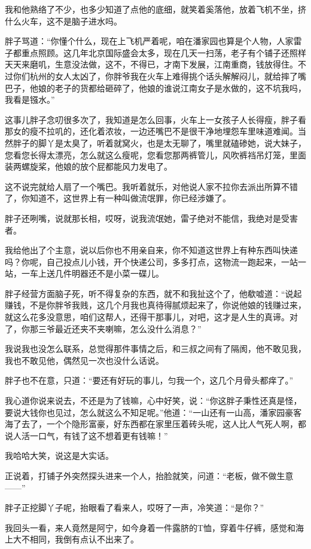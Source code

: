 我和他熟络了不少，也多少知道了点他的底细，就笑着奚落他，放着飞机不坐，挤什么火车，这不是脑子进水吗。

胖子骂道：“你懂个什么，现在上飞机严着呢，咱在潘家园也算是个人物，人家雷子都重点照顾。这几年北京国际盛会太多，现在几天一扫荡，老子有个铺子还照样天天来磨叽，生意没法做，这不，不得已，才南下发展，江南重商，钱放得住。不过你们杭州的女人太凶了，你胖爷我在火车上难得挑个话头解解闷儿，就给摔了嘴巴子，他娘的老子的货都给砸碎了，他娘的谁说江南女子是水做的，这不坑我吗，我看是镪水。”

这事儿胖子念叨很多次了，我知道是怎么回事，火车上一女孩子人长得瘦，胖子看那女的瘦不拉叽的，还化着浓妆，一边还嘴巴不是很干净地埋怨车里味道难闻。当然胖子的脚丫是太臭了，听着就窝火，也是太无聊了，嘴里就磕碜她，说大妹子，您看您长得太漂亮，怎么就这么瘦呢，您看您那两裤管儿，风吹裤裆吊灯笼，里面装两螺旋桨，他娘的放个屁都能风力发电了。

这不说完就给人扇了一个嘴巴。我听着就乐，对他说人家不拉你去派出所算不错了，你知道不，这世界上有一种叫做流氓罪，你已经涉嫌了。

胖子还咧嘴，说就那长相，哎呀，说我流氓她，雷子绝对不能信，我绝对是受害者。

我给他出了个主意，说以后你也不用亲自来，你不知道这世界上有种东西叫快递吗？你呢，自己投点儿小钱，开个快递公司，多多打点，这物流一跑起来，一站一站，一车上送几件明器还不是小菜一碟儿。

胖子经营方面脑子死，听不得复杂的东西，就不和我扯这个了，他欷嘘道：“说起赚钱，不是你胖爷我贱，这几个月我也真待得腻烦起来了，你说他娘的钱赚过来，就这么花多没意思，咱们这帮人，还得干那事儿，对吧，这才是人生的真谛。对了，你那三爷最近还夹不夹喇嘛，怎么没什么消息？”

我说我也没怎么联系，总觉得那件事情之后，和三叔之间有了隔阂，他不敢见我，我也不敢见他，偶然见一次也没什么话说。

胖子也不在意，只道：“要还有好玩的事儿，匀我一个，这几个月骨头都痒了。”

我心道你说来说去，不还是为了钱嘛，心中好笑，说：“你这胖子秉性还真是怪，要说大钱你也见过，怎么就这么不知足呢。”他道：“一山还有一山高，潘家园豪客海了去了，一个个隐形富豪，好东西都在家里压着砖头呢，这人比人气死人啊，都说人活一口气，有钱了这不想着更有钱嘛！”

我哈哈大笑，说这是大实话。

正说着，打铺子外突然探头进来一个人，抬脸就笑，问道：“老板，做不做生意——”

胖子正挖脚丫子呢，抬眼看了看来人，哎呀了一声，冷笑道：“是你？”

我回头一看，来人竟然是阿宁，如今身着一件露脐的T恤，穿着牛仔裤，感觉和海上大不相同，我倒有点认不出来了。

